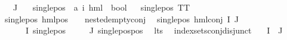 \begin{isabellebody}
{\isachardoublequoteopen}{\isacharparenleft}{\kern0pt}{\isasymPhi}\ {\isacharbackquote}{\kern0pt}\ J{\isacharparenright}{\kern0pt}\ {\isacharequal}{\kern0pt}\ {\isacharbraceleft}{\kern0pt}{\isacharbraceright}{\kern0pt}{\isachardoublequoteclose}\isanewline
\isanewline
{}\isamarkupfalse%
\ single{\isacharunderscore}{\kern0pt}pos\ {\isacharcolon}{\kern0pt}{\isacharcolon}{\kern0pt}\ {\isachardoublequoteopen}{\isacharparenleft}{\kern0pt}{\isacharprime}{\kern0pt}a{\isacharcomma}{\kern0pt}\ {\isacharprime}{\kern0pt}i{\isacharparenright}{\kern0pt}\ hml\ {\isasymRightarrow}\ bool{\isachardoublequoteclose}\isanewline
\ \ \isanewline
{\isachardoublequoteopen}single{\isacharunderscore}{\kern0pt}pos\ TT{\isachardoublequoteclose}\ {\isacharbar}{\kern0pt}\isanewline
{\isachardoublequoteopen}single{\isacharunderscore}{\kern0pt}pos\ {\isacharparenleft}{\kern0pt}hml{\isacharunderscore}{\kern0pt}pos\ {\isacharunderscore}{\kern0pt}\ {\isasympsi}{\isacharparenright}{\kern0pt}{\isachardoublequoteclose}\ \ {\isachardoublequoteopen}nested{\isacharunderscore}{\kern0pt}empty{\isacharunderscore}{\kern0pt}conj\ {\isasympsi}{\isachardoublequoteclose}\ {\isacharbar}{\kern0pt}\isanewline
{\isachardoublequoteopen}single{\isacharunderscore}{\kern0pt}pos\ {\isacharparenleft}{\kern0pt}hml{\isacharunderscore}{\kern0pt}conj\ I\ J\ {\isasymPhi}{\isacharparenright}{\kern0pt}{\isachardoublequoteclose}\isanewline
{}\ {\isachardoublequoteopen}{\isasymforall}{\isasymphi}\ {\isasymin}\ {\isacharparenleft}{\kern0pt}{\isasymPhi}\ {\isacharbackquote}{\kern0pt}\ I{\isacharparenright}{\kern0pt}{\isachardot}{\kern0pt}\ {\isacharparenleft}{\kern0pt}single{\isacharunderscore}{\kern0pt}pos\ {\isasymphi}{\isacharparenright}{\kern0pt}{\isachardoublequoteclose}\isanewline
{\isachardoublequoteopen}{\isasymforall}{\isasymphi}\ {\isasymin}\ {\isacharparenleft}{\kern0pt}{\isasymPhi}\ {\isacharbackquote}{\kern0pt}\ J{\isacharparenright}{\kern0pt}{\isachardot}{\kern0pt}\ single{\isacharunderscore}{\kern0pt}pos{\isacharunderscore}{\kern0pt}pos\ {\isasymphi}{\isachardoublequoteclose}\isanewline
\isanewline
{}\isamarkupfalse%
\ lts\ \isanewline
\isanewline
{}\isamarkupfalse%
\ index{\isacharunderscore}{\kern0pt}sets{\isacharunderscore}{\kern0pt}conj{\isacharunderscore}{\kern0pt}disjunct{\isacharcolon}{\kern0pt}\isanewline
\ \ \ {\isachardoublequoteopen}I\ {\isasyminter}\ J\ {\isasymnoteq}\ {\isacharbraceleft}{\kern0pt}{\isacharbraceright}{\kern0pt}{\isachardoublequoteclose}\isanewline

\end{isabellebody}
